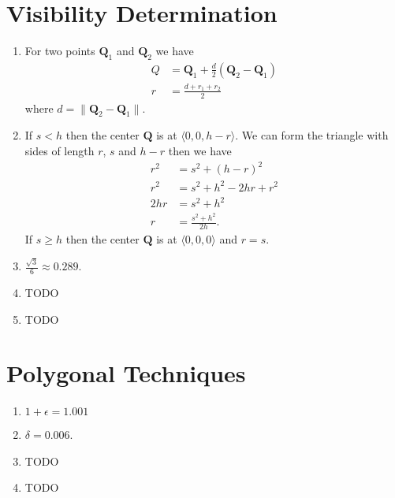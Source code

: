 \documentclass[a4paper]{report}
\begin{document}
\chapter{Visibility Determination}
\begin{enumerate}
	\item For two points $\mathbf{Q}_1$ and $\mathbf{Q}_2$ we have
		\begin{align*}
			Q &= \mathbf{Q}_1 + \frac{d}{2}(\mathbf{Q}_2 - \mathbf{Q}_1)\\
			r &= \frac{d + r_1 + r_2}{2}
		\end{align*}
		where $d = \lVert \mathbf{Q}_2 - \mathbf{Q}_1 \rVert$.
	\item If $s < h$ then the center $\mathbf{Q}$ is at $\langle 0, 0, h - r \rangle$. We can form the triangle
		with sides of length $r$, $s$ and $h - r$ then we have
		\begin{align*}
			r^2 &= s^2 + {(h - r)}^2\\
			r^2 &= s^2 + h^2 - 2hr + r^2\\
			2hr &= s^2 + h^2\\
			r &= \frac{s^2 + h^2}{2h}.
		\end{align*}
		If $s \geq h$ then the center $\mathbf{Q}$ is at $\langle 0, 0, 0 \rangle$ and $r = s$.
	\item $\frac{\sqrt{3}}{6} \approx 0.289$.
	\item TODO
	\item TODO
\end{enumerate}

\chapter{Polygonal Techniques}
\begin{enumerate}
	\item $1 + \epsilon = 1.001$
	\item $\delta = 0.006$.
	\item TODO
	\item TODO
\end{enumerate}
\end{document}
